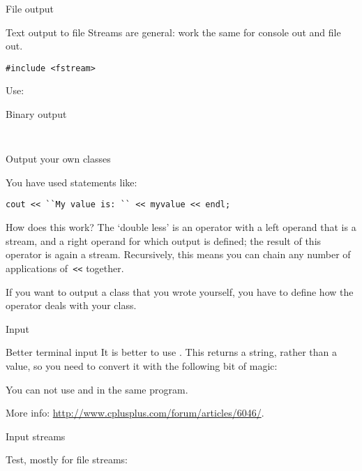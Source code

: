  {File output}

\begin{block}{Text output to file}
  \label{sl:io-file}
Streams are general: work the same for console out and file out.
\begin{verbatim}
#include <fstream>
\end{verbatim}
Use:
\end{block}

\begin{block}{Binary output}
  \label{sl:io-bin}
\begin{verbatim}
  
\end{verbatim}
\end{block}

 {Output your own classes}
\label{sec:lessless}

You have used statements like:
\begin{verbatim}
cout << ``My value is: `` << myvalue << endl;
\end{verbatim}
How does this work? The `double less' is an operator with a left
operand that is a stream, and a right operand for which output is
defined; the result of this operator is again a stream. Recursively,
this means you can chain any number of applications of~\verb+<<+
together.

If you want to output a class that you wrote yourself, you have to
define how the \n{<<} operator deals with your class.


 {Input}

\begin{block}{Better terminal input}
  \label{sl:getline}
  It is better to use . This returns a string,
  rather than a value, so you need to convert it with the following bit
  of magic:

  You can not use  and  in the same program.

  More info:
  \url{http://www.cplusplus.com/forum/articles/6046/}.

\end{block}

 {Input streams}

Test, mostly for file streams:  

